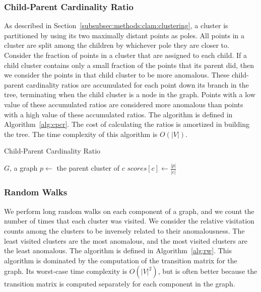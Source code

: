 \subsubsection{Child-Parent Cardinality Ratio}
As described in Section~\ref{subsubsec:methods:clam:clustering}, a cluster is partitioned by using its two maximally distant points as poles.
All points in a cluster are split among the children by whichever pole they are closer to.
Consider the fraction of points in a cluster that are assigned to each child.
If a child cluster contains only a small fraction of the points that its parent did, then we consider the points in that child cluster to be more anomalous.
These child-parent cardinality ratios are accumulated for each point down its branch in the tree, terminating when the child cluster is a node in the graph.
Points with a low value of these accumulated ratios are considered more anomalous than points with a high value of these accumulated ratios.
The algorithm is defined in Algorithm~\ref{alg:cpcr}.
The cost of calculating the ratios is amortized in building the tree.
The time complexity of this algorithm is $O(|V|)$.

\begin{algorithm}[h]
    \caption{Child-Parent Cardinality Ratio}
    \label{alg:cpcr}
\begin{algorithmic}[1]
    \REQUIRE $G$, a graph
        \STATE $p \gets$ the parent cluster of $c$
        \STATE $scores[c] \gets \frac{|p|}{|c|}$
    \ENDFOR
\end{algorithmic}
\end{algorithm}

\subsubsection{Random Walks}
We perform long random walks on each component of a graph, and we count the number of times that each cluster was visited.
We consider the relative visitation counts among the clusters to be inversely related to their anomalousness.
The least visited clusters are the most anomalous, and the most visited clusters are the least anomalous.
The algorithm is defined in Algorithm~\ref{alg:rw}.
This algorithm is dominated by the computation of the transition matrix for the graph.
Its worst-case time complexity is $O(|V|^2)$, but is often better because the transition matrix is computed separately for each component in the graph.

